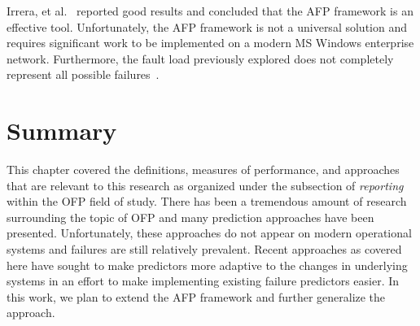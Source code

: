 Irrera, et al.~\cite{irrera2015} reported good results and concluded that the
\ac{AFP} framework is an effective tool.  Unfortunately, the \ac{AFP} framework
is not a universal solution and requires significant work to be implemented on
a modern \ac{MS} Windows enterprise network.  Furthermore, the fault load
previously explored does not completely represent all possible
failures~\cite{kikuchi2014}.

\section{Summary} \label{summary}
This chapter covered the definitions, measures of performance, and approaches
that are relevant to this research as organized under the subsection of
\emph{reporting} within the \ac{OFP} field of study.  There has been a
tremendous amount of research surrounding the topic of \ac{OFP} and many
prediction approaches have been presented.  Unfortunately, these approaches do
not appear on modern operational systems and failures are still relatively
prevalent.  Recent approaches as covered here have sought to make predictors
more adaptive to the changes in underlying systems in an effort to make
implementing existing failure predictors easier.  In this work, we plan to
extend the \ac{AFP} framework and further generalize the
approach.  
